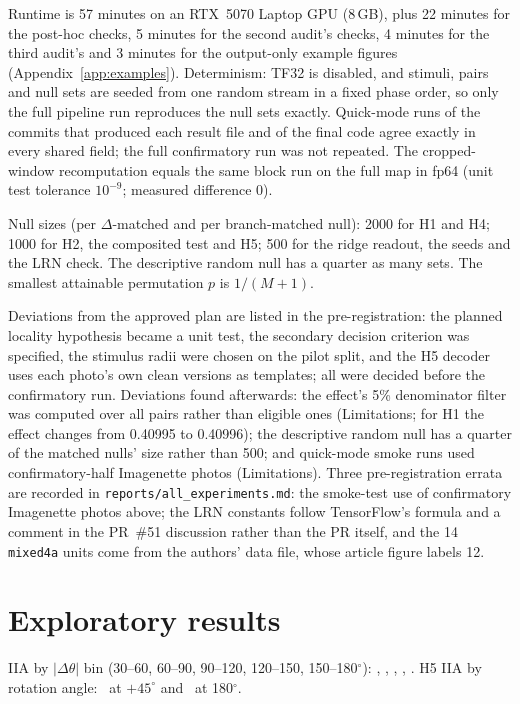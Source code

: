\documentclass[11pt]{article}
\begin{document}
Runtime is 57 minutes on an RTX~5070 Laptop GPU (8\,GB), plus 22 minutes for the post-hoc checks, 5 minutes for the second audit's checks, 4 minutes for the third audit's and 3 minutes for the output-only example figures (Appendix~\ref{app:examples}). Determinism: TF32 is disabled, and stimuli, pairs and null sets are seeded from one random stream in a fixed phase order, so only the full pipeline run reproduces the null sets exactly. Quick-mode runs of the commits that produced each result file and of the final code agree exactly in every shared field; the full confirmatory run was not repeated. The cropped-window recomputation equals the same block run on the full map in fp64 (unit test tolerance $10^{-9}$; measured difference 0).

Null sizes (per $\Delta$-matched and per branch-matched null): 2000 for H1 and H4; 1000 for H2, the composited test and H5; 500 for the ridge readout, the seeds and the LRN check. The descriptive random null has a quarter as many sets. The smallest attainable permutation $p$ is $1/(M+1)$.

Deviations from the approved plan are listed in the pre-registration: the planned locality hypothesis became a unit test, the secondary decision criterion was specified, the stimulus radii were chosen on the pilot split, and the H5 decoder uses each photo's own clean versions as templates; all were decided before the confirmatory run. Deviations found afterwards: the effect's 5\% denominator filter was computed over all pairs rather than eligible ones (Limitations; for H1 the effect changes from 0.40995 to 0.40996); the descriptive random null has a quarter of the matched nulls' size rather than 500; and quick-mode smoke runs used confirmatory-half Imagenette photos (Limitations). Three pre-registration errata are recorded in \texttt{reports/all\_experiments.md}: the smoke-test use of confirmatory Imagenette photos above; the LRN constants follow TensorFlow's formula and a comment in the PR~\#51 discussion rather than the PR itself, and the 14 \texttt{mixed4a} units come from the authors' data file, whose article figure labels 12.

\section{Exploratory results}
IIA by $|\Delta\theta|$ bin (30--60, 60--90, 90--120, 120--150, 150--180$^\circ$): \DThetaA, \DThetaB, \DThetaC, \DThetaD, \DThetaE. H5 IIA by rotation angle: \HFiveIIAFortyFive\ at $+45^\circ$ and \HFiveIIAOneEighty\ at 180$^\circ$.
\end{document}

